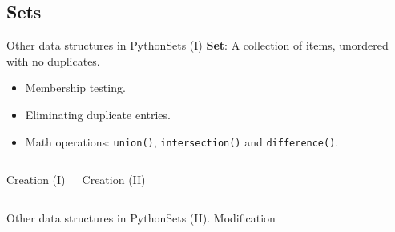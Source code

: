 \documentclass[10pt,compress]{beamer} %
\begin{document}
\subsection{Sets}
\begin{frame}{Other data structures in Python}{Sets (I)}
\vspace{-0.2cm}
	\textbf{Set}: A collection of items, unordered with no duplicates.
		\begin{itemize}
		\item \small{Membership testing.}
		\item \small{Eliminating duplicate entries.}
		\item \small{Math operations: \texttt{union()}, \texttt{intersection()} and \texttt{difference()}.}
		\end{itemize}
\vspace{-0.2cm}
    \begin{columns}
 	   \scriptsize{
		\begin{block}{Creation (I)}
		\vspace{-0.2cm}
		
		
		\vspace{-0.2cm}
		\end{block}
		}
		

 	  \scriptsize{
 	   \begin{block}{Creation (II)}
		\vspace{-0.2cm}
		
		
		\vspace{-0.2cm}
		
		\end{block}
		\vspace{0.3cm}
		}
	\end{columns}
\end{frame}

	

%		

\begin{frame}{Other data structures in Python}{Sets (II). Modification}
 	  
 	   \tiny{
		\begin{block}{}
		
		\vspace{-0.2cm}
		
		\vspace{-0.2cm}
		
		\end{block}
   }
\end{frame}
\end{document}
